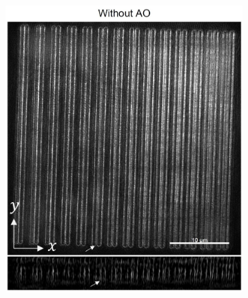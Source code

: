 \begin{figure}
	\centering
	\begin{subfigure}[t]{0.45\textwidth}
		\centering
		\includegraphics[width=\linewidth]{images/Argolight_slide_woAO_axis.jpg}
		\caption{}
		\label{fig:Argolight_slide_woAO_axis}
	\end{subfigure}
	\begin{subfigure}[t]{0.45\textwidth}
		\centering

\end{subfigure}
\end{figure}
